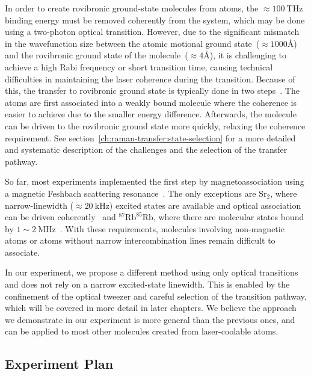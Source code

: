 In order to create rovibronic ground-state molecules from atoms,
the $\approx\!100~\mathrm{THz}$ binding energy must be removed coherently from the system,
which may be done using a two-photon optical transition.
However, due to the significant mismatch in the wavefunction size
between the atomic motional ground state~($\approx\!1000\text{\AA}$)
and the rovibronic ground state of the molecule~($\approx\!4\text{\AA}$),
it is challenging to achieve a high Rabi frequency or short transition time,
causing technical difficulties in maintaining the laser coherence during the transition.
Because of this, the transfer to rovibronic ground state is typically done in two steps~\cite{
  danzl_quantum_2008,ni_high_2008,lang_ultracold_2008,takekoshi_ultracold_2014,
  molony_creation_2014,park_ultracold_2015,guo_creation_2016,rvachov_long-lived_2017,
  kondov_molecular_2019,voges_ultracold_2020}.
The atoms are first associated into a weakly bound molecule
where the coherence is easier to achieve due to the smaller energy difference.
Afterwards, the molecule can be driven to the rovibronic ground state more quickly,
relaxing the coherence requirement. See section~\ref{ch:raman-transfer:state-selection}
for a more detailed and systematic description of the challenges
and the selection of the transfer pathway.

So far, most experiments implemented the first step
by magnetoassociation using a magnetic Feshbach scattering resonance~\cite{
  ni_high_2008,zhang_forming_2020}.
The only exceptions are $\mathrm{Sr}_2$,
where narrow-linewidth ($\approx\!20~\mathrm{kHz}$) excited states
are available and optical association can be driven coherently~\cite{
  reinaudi_optical_2012,stellmer_creation_2012}
and $^{87}\mathrm{Rb}^{85}\mathrm{Rb}$,
where there are molecular states bound by $1\sim2~\mathrm{MHz}$~\cite{he_coherently_2020}.
With these requirements, molecules involving non-magnetic atoms
or atoms without narrow intercombination lines remain difficult to associate.

In our experiment, we propose a different method using only optical transitions
and does not rely on a narrow excited-state linewidth.
This is enabled by the confinement of the optical tweezer and
careful selection of the transition pathway,
which will be covered in more detail in later chapters.
We believe the approach we demonstrate in our experiment is more general
than the previous ones,
and can be applied to most other molecules created from laser-coolable atoms.

\subsection{Experiment Plan}
\label{ch:introduction:tweezers:plan}

